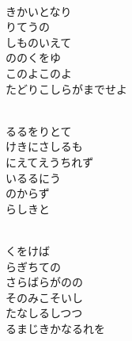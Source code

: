 \documentclass[10pt,b5j]{tarticle} %
\begin{document}
\begin{enumerate}
\begin{minipage}[c]{\blocksize}
        \vspace{\linespace}
        \item~\\
        きかいとなり\\
        りてうの\\
        しものいえて\\
        ののくをゆ\\
        このよこのよ\\
        たどりこしらがまでせよ
        
    \end{minipage}
    \begin{minipage}[c]{\blocksize}
        
        \vspace{\linespace}
        \item~\\
        るるをりとて\\
        けきにさしるも\\
        にえてえうちれず\\
        いるるにう\\
        のからず\\
        らしきと
        
    \end{minipage}
    \begin{minipage}[c]{\blocksize}
        
        \vspace{\linespace}
        \item~\\
        くをけば\\
        らぎちての\\
        さらばらがのの\\
        そのみこそいし\\
        たなしるしつつ\\
        るまじきかなるれを
    
    \end{minipage}
\end{enumerate} %
\end{document}
